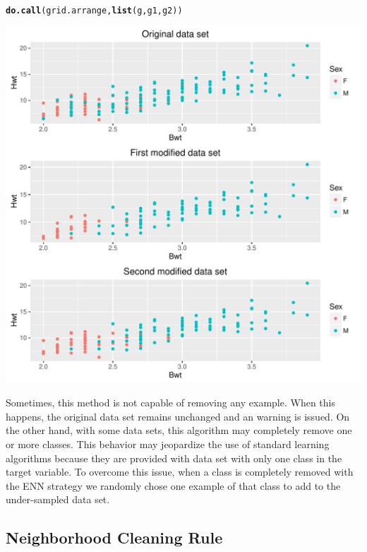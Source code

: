 \documentclass[10pt,a4paper]{article}\usepackage[]{graphicx}\usepackage[]{color}
\makeatletter
\def\maxwidth{ %
  \ifdim\Gin@nat@width>\linewidth
    \linewidth
  \else
    \Gin@nat@width
  \fi
}
\newcommand{\hlstd}[1]{\textcolor[rgb]{0.345,0.345,0.345}{#1}}%
\newcommand{\hlkwd}[1]{\textcolor[rgb]{0.737,0.353,0.396}{\textbf{#1}}}%
\newenvironment{kframe}{%
 \def\at@end@of@kframe{}%
 \ifinner\ifhmode%
  \def\at@end@of@kframe{\end{minipage}}%
  \begin{minipage}{\columnwidth}%
 \fi\fi%
 \def\FrameCommand##1{\hskip\@totalleftmargin \hskip-\fboxsep
 \colorbox{shadecolor}{##1}\hskip-\fboxsep
     \hskip-\linewidth \hskip-\@totalleftmargin \hskip\columnwidth}%
 \MakeFramed {\advance\hsize-\width
   \@totalleftmargin\z@ \linewidth\hsize
   \@setminipage}}%
 {\par\unskip\endMakeFramed%
 \at@end@of@kframe}
\newenvironment{knitrout}{}{} %
\makeatother
\begin{document}
\begin{knitrout}
\begin{kframe}
\begin{alltt}
\hlkwd{do.call}\hlstd{(grid.arrange,} \hlkwd{list}\hlstd{(g,g1,g2))}
\end{alltt}
\end{kframe}

{\centering \includegraphics[width=\maxwidth]{figures/UBL-ENN_cats-1} 

}



\end{knitrout}

Sometimes, this method is not capable of removing any example. When this happens, the original data set remains unchanged and an warning is issued. On the other hand, with some data sets, this algorithm may completely remove one or more classes. This behavior may jeopardize the use of standard learning algorithms because they are provided with data set with only one class in the target variable. To overcome this issue, when a class is completely removed with the ENN strategy we randomly chose one example of that class to add to the under-sampled data set.


\subsection{Neighborhood Cleaning Rule}\label{sec:NCL}
\end{document}
